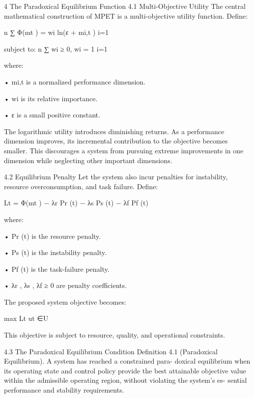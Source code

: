 \documentclass[10pt,a4paper]{article}
\begin{document}
\begin{ManuscriptText}
4     The Paradoxical Equilibrium Function
4.1     Multi-Objective Utility
The central mathematical construction of MPET is a multi-objective utility function.
  Define:

                                            n
                                           ∑︂
                                Φ(mt ) =           wi ln(ε + mi,t )
                                             i=1

    subject to:
                                                        n
                                                       ∑︂
                                   wi ≥ 0,                   wi = 1
                                                       i=1

    where:

    • mi,t is a normalized performance dimension.


  • wi is its relative importance.

  • ε is a small positive constant.

   The logarithmic utility introduces diminishing returns.
   As a performance dimension improves, its incremental contribution to the objective
becomes smaller.
   This discourages a system from pursuing extreme improvements in one dimension
while neglecting other important dimensions.


4.2    Equilibrium Penalty
Let the system also incur penalties for instability, resource overconsumption, and task
failure.
    Define:

                       Lt = Φ(mt ) − λr Pr (t) − λs Ps (t) − λf Pf (t)

   where:

  • Pr (t) is the resource penalty.

  • Ps (t) is the instability penalty.

  • Pf (t) is the task-failure penalty.

  • λr , λs , λf ≥ 0 are penalty coefficients.

   The proposed system objective becomes:

                                              max Lt
                                              ut ∈U

   This objective is subject to resource, quality, and operational constraints.


4.3    The Paradoxical Equilibrium Condition
Definition 4.1 (Paradoxical Equilibrium). A system has reached a constrained para-
doxical equilibrium when its operating state and control policy provide the best attainable
objective value within the admissible operating region, without violating the system’s es-
sential performance and stability requirements.


\end{ManuscriptText}
\end{document}
